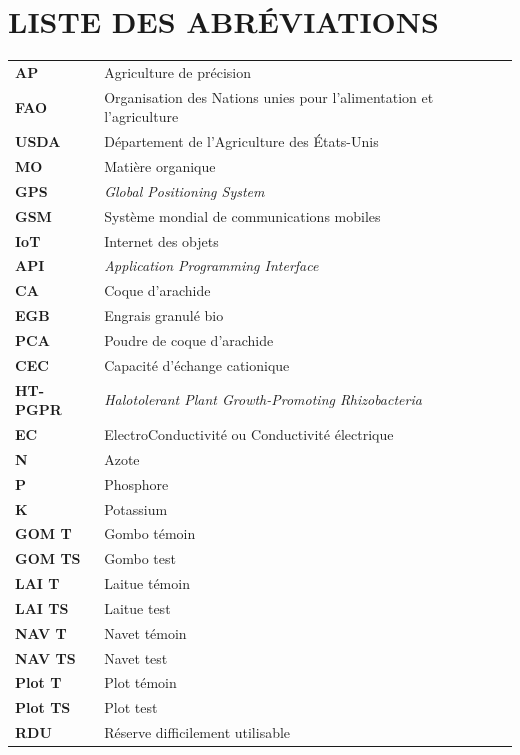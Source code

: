 \chapter*{LISTE DES ABRÉVIATIONS}

\begin{longtable}{p{3.5cm}p{11cm}}
    \textbf{AP} & Agriculture de précision \\
    \textbf{FAO} & Organisation des Nations unies pour l'alimentation et l'agriculture \\
    \textbf{USDA} & Département de l'Agriculture des États-Unis \\
    \textbf{MO} & Matière organique \\
    \textbf{GPS} & \textit{Global Positioning System} \\
    \textbf{GSM} & Système mondial de communications mobiles \\
    \textbf{IoT} & Internet des objets \\
    \textbf{API} & \textit{Application Programming Interface} \\
    \textbf{CA} & Coque d'arachide \\
    \textbf{EGB} & Engrais granulé bio \\
    \textbf{PCA} & Poudre de coque d'arachide \\
    \textbf{CEC} & Capacité d'échange cationique \\
    \textbf{HT-PGPR} & \textit{Halotolerant Plant Growth-Promoting Rhizobacteria} \\
    \textbf{EC} & ElectroConductivité ou Conductivité électrique \\
    \textbf{N} & Azote \\
    \textbf{P} & Phosphore \\
    \textbf{K} & Potassium \\
    \textbf{GOM T} & Gombo témoin \\
    \textbf{GOM TS} & Gombo test \\
    \textbf{LAI T} & Laitue témoin \\
    \textbf{LAI TS} & Laitue test \\
    \textbf{NAV T} & Navet témoin \\
    \textbf{NAV TS} & Navet test \\
    \textbf{Plot T} & Plot témoin \\
    \textbf{Plot TS} & Plot test \\
    \textbf{RDU} & Réserve difficilement utilisable \\

\end{longtable}
